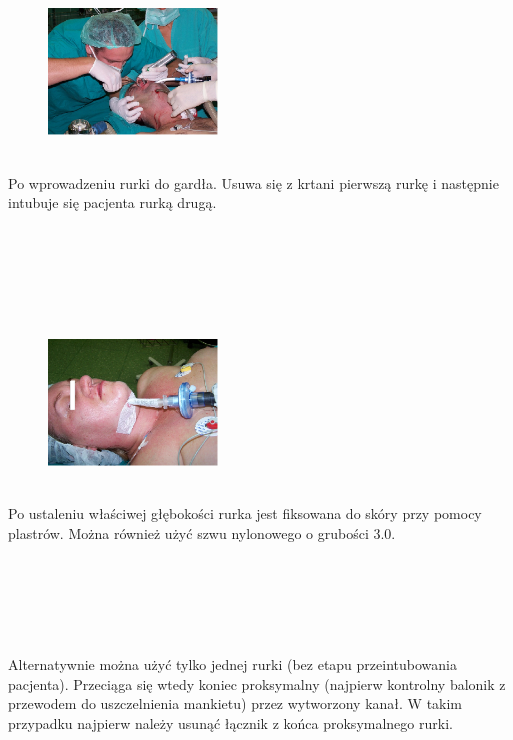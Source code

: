 \documentclass[a4paper, 12pt]{report}
\begin{document}
\begin{figure}
\includegraphics[width=0.4\textwidth]{images/itp4}
\end{figure}

\hfill\\
Po wprowadzeniu rurki do gardła. Usuwa się z krtani pierwszą rurkę i
następnie intubuje się pacjenta rurką drugą.

\newpage
\hfill\\
\hfill\\
\hfill\\
\hfill\\
\hfill\\

\begin{figure}
\includegraphics[width=0.4\textwidth]{images/itp5}
\end{figure}

\hfill\\
Po ustaleniu właściwej głębokości rurka jest fiksowana do skóry przy
pomocy plastrów. Można również użyć szwu nylonowego o grubości 3.0.

\hfill\\
\hfill\\
\hfill\\
\hfill\\
\hfill\\

Alternatywnie można użyć tylko jednej rurki (bez etapu
przeintubowania pacjenta). Przeciąga się wtedy koniec proksymalny
(najpierw kontrolny balonik z przewodem do uszczelnienia mankietu)
przez wytworzony kanał. W takim przypadku najpierw należy usunąć
łącznik z końca proksymalnego rurki.
\end{document}

